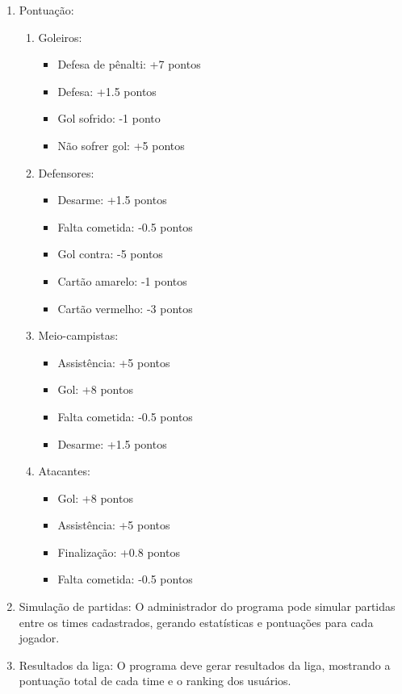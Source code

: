 \documentclass[12pt]{article}
\begin{document}
\begin{enumerate}
\begin{enumerate}
        \end{enumerate}
  \item Pontuação:
        \begin{enumerate}
          \item Goleiros:
                \begin{itemize}
                  \item Defesa de pênalti: +7 pontos
                  \item Defesa: +1.5 pontos
                  \item Gol sofrido: -1 ponto
                  \item Não sofrer gol: +5 pontos
                \end{itemize}
          \item Defensores:
                \begin{itemize}
                  \item Desarme: +1.5 pontos
                  \item Falta cometida: -0.5 pontos
                  \item Gol contra: -5 pontos
                  \item Cartão amarelo: -1 pontos
                  \item Cartão vermelho: -3 pontos
                \end{itemize}
          \item Meio-campistas:
                \begin{itemize}
                  \item Assistência: +5 pontos
                  \item Gol: +8 pontos
                  \item Falta cometida: -0.5 pontos
                  \item Desarme: +1.5 pontos
                \end{itemize}
          \item Atacantes:
                \begin{itemize}
                  \item Gol: +8 pontos
                  \item Assistência: +5 pontos
                  \item Finalização: +0.8 pontos
                  \item Falta cometida: -0.5 pontos
                \end{itemize}
        \end{enumerate}
  \item Simulação de partidas: O administrador do programa pode simular partidas entre os times cadastrados, gerando estatísticas e pontuações para cada jogador.
  \item Resultados da liga: O programa deve gerar resultados da liga, mostrando a pontuação total de cada time e o ranking dos usuários.
\end{enumerate}
\end{document}

